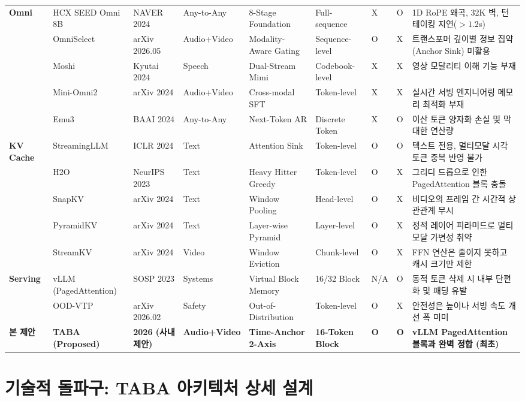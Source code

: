 \documentclass[10pt, a4paper, twocolumn]{article}
\begin{document}
\begin{table}[t]
\begin{tabular}{p{0.9cm}p{2.1cm}p{1.3cm}p{1.5cm}p{2.2cm}p{1.6cm}p{0.6cm}p{0.9cm}p{4.2cm}}
\textbf{Omni} & HCX SEED Omni 8B & NAVER 2024 & Any-to-Any & 8-Stage Foundation & Full-sequence & X & O & 1D RoPE 왜곡, 32K 벽, 턴테이킹 지연($>1.2$s) \\
& OmniSelect & arXiv 2026.05 & Audio+Video & Modality-Aware Gating & Sequence-level & O & X & 트랜스포머 깊이별 정보 집약(Anchor Sink) 미활용 \\
& Moshi & Kyutai 2024 & Speech & Dual-Stream Mimi & Codebook-level & X & X & 영상 모달리티 이해 기능 부재 \\
& Mini-Omni2 & arXiv 2024 & Audio+Video & Cross-modal SFT & Token-level & X & X & 실시간 서빙 엔지니어링 메모리 최적화 부재 \\
& Emu3 & BAAI 2024 & Any-to-Any & Next-Token AR & Discrete Token & X & O & 이산 토큰 양자화 손실 및 막대한 연산량 \\
\midrule
\textbf{KV Cache} & StreamingLLM & ICLR 2024 & Text & Attention Sink & Token-level & O & O & 텍스트 전용, 멀티모달 시각 토큰 중복 반영 불가 \\
& H2O & NeurIPS 2023 & Text & Heavy Hitter Greedy & Token-level & O & X & 그리디 드롭으로 인한 PagedAttention 블록 충돌 \\
& SnapKV & arXiv 2024 & Text & Window Pooling & Head-level & O & X & 비디오의 프레임 간 시간적 상관관계 무시 \\
& PyramidKV & arXiv 2024 & Text & Layer-wise Pyramid & Layer-level & O & X & 정적 레이어 피라미드로 멀티모달 가변성 취약 \\
& StreamKV & arXiv 2024 & Video & Window Eviction & Chunk-level & O & X & FFN 연산은 줄이지 못하고 캐시 크기만 제한 \\
\midrule
\textbf{Serving} & vLLM (PagedAttention) & SOSP 2023 & Systems & Virtual Block Memory & 16/32 Block & N/A & O & 동적 토큰 삭제 시 내부 단편화 및 패딩 유발 \\
& OOD-VTP & arXiv 2026.02 & Safety & Out-of-Distribution & Token-level & O & X & 안전성은 높이나 서빙 속도 개선 폭 미미 \\
\midrule
\textbf{본 제안} & \textbf{TABA (Proposed)} & \textbf{2026 (사내 제안)} & \textbf{Audio+Video} & \textbf{Time-Anchor 2-Axis} & \textbf{16-Token Block} & \textbf{O} & \textbf{O} & \textbf{vLLM PagedAttention 블록과 완벽 정합 (최초)} \\
\bottomrule
\end{tabular}
\end{table}

\section{기술적 돌파구: TABA 아키텍처 상세 설계}
\end{document}
